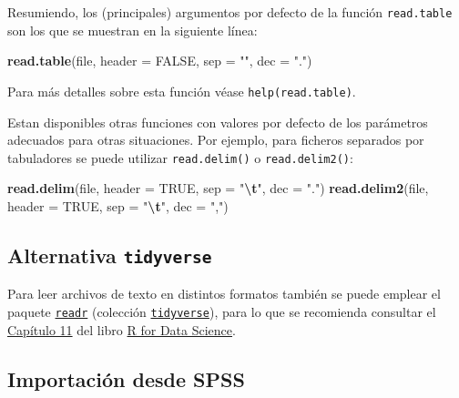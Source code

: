 \documentclass[
]{book}
\newenvironment{Shaded}{\begin{snugshade}}{\end{snugshade}}
\newcommand{\AttributeTok}[1]{\textcolor[rgb]{0.13,0.29,0.53}{#1}}
\newcommand{\ConstantTok}[1]{\textcolor[rgb]{0.56,0.35,0.01}{#1}}
\newcommand{\FunctionTok}[1]{\textcolor[rgb]{0.13,0.29,0.53}{\textbf{#1}}}
\newcommand{\NormalTok}[1]{#1}
\newcommand{\SpecialCharTok}[1]{\textcolor[rgb]{0.81,0.36,0.00}{\textbf{#1}}}
\newcommand{\StringTok}[1]{\textcolor[rgb]{0.31,0.60,0.02}{#1}}
\begin{document}
Resumiendo, los (principales) argumentos por defecto de la función
\texttt{read.table} son los que se muestran en la siguiente línea:

\begin{Shaded}
\begin{Highlighting}[]
\FunctionTok{read.table}\NormalTok{(file, }\AttributeTok{header =} \ConstantTok{FALSE}\NormalTok{, }\AttributeTok{sep =} \StringTok{""}\NormalTok{, }\AttributeTok{dec =} \StringTok{"."}\NormalTok{)  }
\end{Highlighting}
\end{Shaded}

Para más detalles sobre esta función véase
\texttt{help(read.table)}.

Estan disponibles otras funciones con valores por defecto de los parámetros
adecuados para otras situaciones. Por ejemplo, para ficheros separados por tabuladores
se puede utilizar \texttt{read.delim()} o \texttt{read.delim2()}:

\begin{Shaded}
\begin{Highlighting}[]
\FunctionTok{read.delim}\NormalTok{(file, }\AttributeTok{header =} \ConstantTok{TRUE}\NormalTok{, }\AttributeTok{sep =} \StringTok{"}\SpecialCharTok{\textbackslash{}t}\StringTok{"}\NormalTok{, }\AttributeTok{dec =} \StringTok{"."}\NormalTok{)}
\FunctionTok{read.delim2}\NormalTok{(file, }\AttributeTok{header =} \ConstantTok{TRUE}\NormalTok{, }\AttributeTok{sep =} \StringTok{"}\SpecialCharTok{\textbackslash{}t}\StringTok{"}\NormalTok{, }\AttributeTok{dec =} \StringTok{","}\NormalTok{)}
\end{Highlighting}
\end{Shaded}

\subsection{\texorpdfstring{Alternativa \texttt{tidyverse}}{Alternativa tidyverse}}\label{alternativa-tidyverse}

Para leer archivos de texto en distintos formatos también se puede emplear el paquete \href{https://readr.tidyverse.org}{\texttt{readr}}
(colección \href{https://www.tidyverse.org/}{\texttt{tidyverse}}), para lo que se recomienda
consultar el \href{https://r4ds.had.co.nz/data-import.html}{Capítulo 11} del libro \href{http://r4ds.had.co.nz}{R for Data Science}.

\subsection{Importación desde SPSS}\label{importaciuxf3n-desde-spss}
\end{document}
